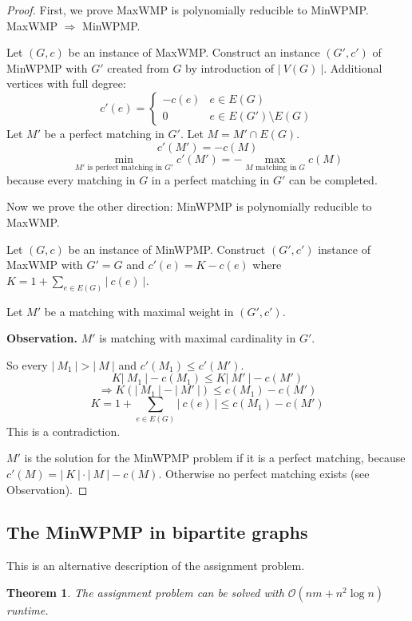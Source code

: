 \documentclass{article}
\newtheorem{theorem}{Theorem}
\newcommand{\card}[1]{\left|\:\!#1\:\!\right|}
\begin{document}
\begin{proof}
  First, we prove MaxWMP is polynomially reducible to MinWPMP. MaxWMP $\Rightarrow$ MinWPMP.

  Let $(G, c)$ be an instance of MaxWMP.
  Construct an instance $(G', c')$ of MinWPMP with $G'$ created from $G$ by introduction of $\card{V(G)}$.
  Additional vertices with full degree:
  \[
    c'(e) = \begin{cases}
      -c(e)  & e \in E(G) \\
      0      & e \in E(G') \setminus E(G)
    \end{cases}
  \]
  Let $M'$ be a perfect matching in $G'$. Let $M = M' \cap E(G)$.
  \[ c'(M') = -c(M) \]
  \[ \min_{M' \text{ is perfect matching in } G'} c'(M') = -\max_{M \text{ matching in } G} c(M) \]
  because every matching in $G$ in a perfect matching in $G'$ can be completed.

  Now we prove the other direction: MinWPMP is polynomially reducible to MaxWMP.

  Let $(G, c)$ be an instance of MinWPMP. Construct $(G', c')$ instance of MaxWMP with $G' = G$ and $c'(e) = K - c(e)$ where $K = 1 + \sum_{e \in E(G)} \card{c(e)}$.

  Let $M'$ be a matching with maximal weight in $(G', c')$.

  \textbf{Observation.} $M'$ is matching with maximal cardinality in $G'$.

  So every $\card{M_1} > \card{M}$ and $c'(M_1) \leq c'(M')$.
  \[
    K \card{M_1} - c(M_1) \leq K \card{M'} - c(M')
  \] \[
    \Rightarrow K\left( \card{M_1} - \card{M'} \right) \leq c(M_1) - c(M')
  \] \[
    K = 1 + \sum_{e \in E(G)} \card{c(e)} \leq c(M_1) - c(M')
  \]
  This is a contradiction.

  $M'$ is the solution for the MinWPMP problem if it is a perfect matching, because $c'(M) = \card{K} \cdot \card{M} - c(M)$.
  Otherwise no perfect matching exists (see Observation).
\end{proof}

\subsection{The MinWPMP in bipartite graphs}

This is an alternative description of the assignment problem.

\begin{theorem}\label{satz-7.2_}
  The assignment problem can be solved with $\mathcal{O}(nm + n^2\log{n})$ runtime.
\end{theorem}
\end{document}
